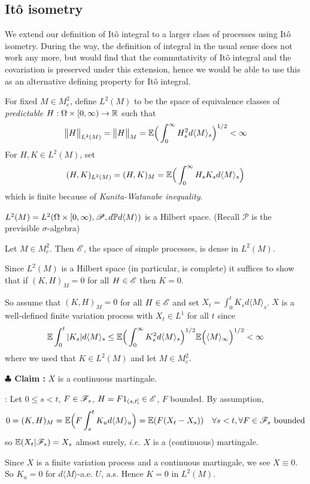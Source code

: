 \documentclass[12pt,a4paper]{article}
\newenvironment{proof}
{\begin{changemargin}{0.5cm}{0.5cm} 
	}%
	{\end{changemargin}
}
\newenvironment{subproof}
{\begin{changemargin}{0.5cm}{0.5cm} 
	}%
	{\end{changemargin}
}
\newenvironment{p}
{\begin{proof} 
	}%
	{\end{proof}
}
\begin{document}
\subsection{It\^o isometry}

We extend our definition of It\^o integral to a larger class of processes using It\^o isometry. During the way, the definition of integral in the usual sense does not work any more, but would find that the commutativity of It\^o integral and the covariation is preserved under this extension, hence we would be able to use this as an alternative defining property for It\^o integral.
\s

 For fixed $M\in M_c^2$, define $L^2(M)$ to be the space of equivalence classes of \emph{predictable} $H: \Omega \times [0, \infty) \rightarrow \mathbb{R}$ such that
\begin{align*}
\bigl\lVert H\bigr\rVert_{L^2(M)} = \bigl\lVert H\bigr\rVert_{M} = \mathbb{E} \Big( \int_0^{\infty} H_s^2 d\langle M \rangle_s \Big)^{1/2} < \infty
\end{align*}
For $H, K \in L^2(M)$, set
\begin{align*}
(H, K)_{L^2(M)} = (H, K)_M = \mathbb{E} \Big(\int_0^{\infty} H_s K_s d\langle M \rangle_s \Big)
\end{align*}
which is finite because of \emph{Kunita-Watanabe inequality}.
\s

\fact $L^2(M) = L^2(\Omega \times [0, \infty), \mathscr{P}, d\mathbb{P} d\langle M \rangle)$ is a Hilbert space. (Recall $\mathscr{P}$ is the previsible $\sigma$-algebra)
\s

\prop Let $M\in M_c^2$. Then $\mathscr{E}$, the space of simple processes, is dense in $L^2(M)$.
\begin{p}
\pf Since $L^2(M)$ is a Hilbert space (in particular, is complete) it suffices to show that if $(K, H)_M =0$ for all $H\in \mathscr{E}$ then $K=0$.

\quad So assume that $(K, H)_M =0$ for all $H\in \mathscr{E}$ and set $X_t = \int_0^t K_s d\langle M \rangle_s$. $X$ is a well-defined finite variation process with $X_t \in L^1$ for all $t$ since 
\begin{align*}
\mathbb{E} \int_0^t |K_s| d\langle M \rangle_s \leq \mathbb{E} \Big( \int_0^{\infty} K_s^2 d\langle M \rangle_s \Big)^{1/2} \mathbb{E} \Big( \langle M \rangle_{\infty} \Big)^{1/2} < \infty
\end{align*}
where we used that $K\in L^2(M)$ and let $M\in M_c^2$.

\textbf{$\clubsuit$ Claim :} $X$ is a continuous martingale.
\begin{subproof}
: Let $0\leq s <t$, $F\in \mathscr{F}_s$, $H= F1_{(s,t]} \in \mathscr{E}$, $F$ bounded. By assumption,
\begin{align*}
0 = (K, H)_M = \mathbb{E} \Big( F\int_s^t K_u d\langle M \rangle_u \Big) = \mathbb{E} (F(X_t -X_s)) \quad \forall s<t, \forall F\in \mathscr{F}_s \text{ bounded}
\end{align*}
so $\mathbb{E} (X_t |\mathscr{F}_s) = X_s$ almost surely, \textit{i.e.} $X$ is a (continuous) martingale. 
\end{subproof}
Since $X$ is a finite variation process and a continuous martingale, we see $X\equiv 0$. So $K_u =0$ for $d\langle M \rangle$-a.e. $U$, a.s. Hence $K=0$ in $L^2(M)$.

\eop
\end{p}
\s
\end{document}
